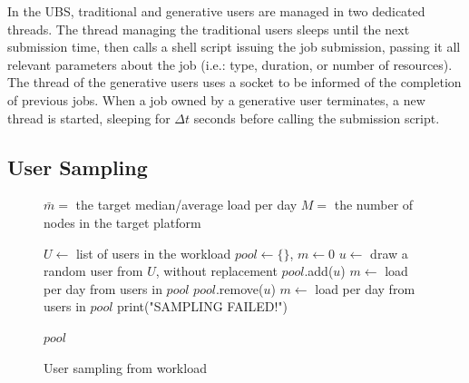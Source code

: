 \documentclass[a4paper,fleqn]{cas-dc}
\begin{document}
In the UBS, traditional and generative users are managed in two dedicated threads. 
The thread managing the traditional users sleeps until the next submission time, then calls a shell script issuing the job submission, passing it all relevant parameters about the job (i.e.: type, duration, or number of resources).
The thread of the generative users uses a socket to be informed of the completion of previous jobs. 
When a job owned by a generative user terminates, a new thread is started, sleeping for $\Delta t$ seconds before calling the submission script.

\subsection{User Sampling}
\label{subsec:sampling}

\renewcommand{\algorithmicrequire}{\textbf{Input:}}
\renewcommand{\algorithmicensure}{\textbf{Output:}}

\begin{figure}[tbp]
  \centering
  \begin{minipage}{.6\linewidth}
    \begin{algorithm}[H]
    \caption{User sampling from workload}\label{alg:sampling}
    \begin{algorithmic}[1]
        \REQUIRE $\bar{m} =$ the target median/average load per day
        \REQUIRE $M =$ the number of nodes in the target platform

        \STATE $U \leftarrow$ list of users in the workload
        \STATE $pool \leftarrow \{\}$, $m \leftarrow 0$
            \STATE $u \leftarrow$ draw a random user from $U$, without replacement 
                \STATE $pool$.add($u$)
                \STATE $m \leftarrow$ load per day from users in $pool$
                    \STATE $pool$.remove($u$)
                    \STATE $m \leftarrow$ load per day from users in $pool$
                \ENDIF
            \ENDIF
        \ENDWHILE
            \STATE print("SAMPLING FAILED!")
        \ENDIF

        \ENSURE $pool$
    \end{algorithmic}

    \end{algorithm}
  \end{minipage}
\end{figure}
\end{document}
